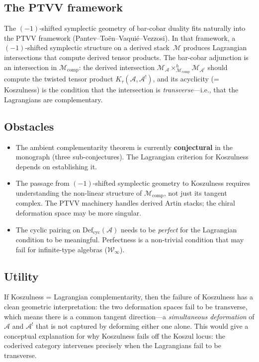 \documentclass[11pt]{article}
\newcommand{\cA}{\mathcal{A}}
\newcommand{\Def}{\mathrm{Def}}
\theoremstyle{plain}
\theoremstyle{definition}
\theoremstyle{remark}
\begin{document}
\subsection{The PTVV framework}

The $(-1)$-shifted symplectic geometry of bar-cobar duality
fits naturally into the PTVV framework
(Pantev--To\"{e}n--Vaqui\'{e}--Vezzosi).  In that framework,
a $(-1)$-shifted symplectic structure on a derived stack~$\mathcal{M}$
produces Lagrangian intersections that compute derived tensor
products.  The bar-cobar adjunction is an intersection in
$\mathcal{M}_{\mathrm{comp}}$: the derived intersection
$\mathcal{M}_\cA \times^h_{\mathcal{M}_{\mathrm{comp}}}
\mathcal{M}_{\cA^!}$ should compute the twisted tensor product
$K_\tau(\cA, \cA^!)$, and its acyclicity (= Koszulness) is the
condition that the intersection is \emph{transverse}---i.e., that
the Lagrangians are complementary.

\subsection{Obstacles}

\begin{itemize}
\item The ambient complementarity theorem is currently
  \textbf{conjectural} in the monograph (three sub-conjectures).
  The Lagrangian criterion for Koszulness depends on establishing
  it.
\item The passage from $(-1)$-shifted symplectic geometry to
  Koszulness requires understanding the non-linear structure of
  $\mathcal{M}_{\mathrm{comp}}$, not just its tangent complex.
  The PTVV machinery handles derived Artin stacks; the chiral
  deformation space may be more singular.
\item The cyclic pairing on $\Def_{\mathrm{cyc}}(\cA)$ needs to
  be \emph{perfect} for the Lagrangian condition to be meaningful.
  Perfectness is a non-trivial condition that may fail for
  infinite-type algebras ($\mathcal{W}_\infty$).
\end{itemize}

\subsection{Utility}

If Koszulness = Lagrangian complementarity, then the failure of
Koszulness has a clean geometric interpretation: the two
deformation spaces fail to be transverse, which means there is a
common tangent direction---a \emph{simultaneous deformation} of
$\cA$ and $\cA^!$ that is not captured by deforming either one
alone.  This would give a conceptual explanation for why
Koszulness fails off the Koszul locus: the coderived category
intervenes precisely when the Lagrangians fail to be transverse.
\end{document}
